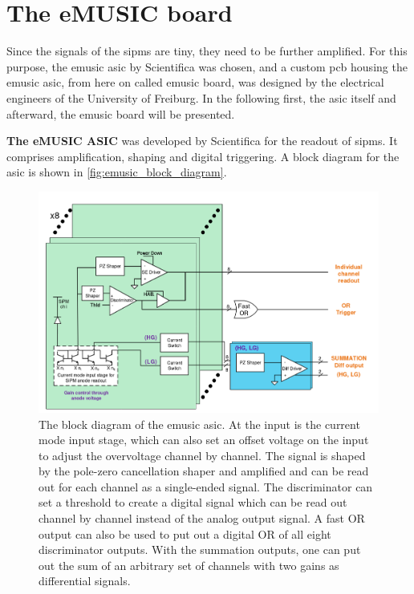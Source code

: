 \section{The eMUSIC board}
Since the signals of the \acp{sipm} are tiny, they need to be further amplified.
For this purpose, the \ac{emusic} \ac{asic} by Scientifica \cite{emusic} was chosen, and a custom \ac{pcb} housing the \ac{emusic} \ac{asic}, from here on called \ac{emusic} board, was designed by the electrical engineers of the University of Freiburg.
In the following first, the \ac{asic} itself and afterward, the \ac{emusic} board will be presented.

\textbf{The eMUSIC ASIC} was developed by Scientifica for the readout of \acp{sipm}.
It comprises amplification, shaping and digital triggering.
A block diagram for the \ac{asic} is shown in \autoref{fig:emusic_block_diagram}.
\begin{figure}
	\centering
	\includegraphics[width=1.\textwidth]{pictures/emusic_block_diagram.png}
	\caption[eMUSIC block diagram]{The block diagram of the \ac{emusic} \ac{asic}. At the input is the current mode input stage, which can also set an offset voltage on the input to adjust the overvoltage channel by channel. The signal is shaped by the pole-zero cancellation shaper and amplified and can be read out for each channel as a single-ended signal. The discriminator can set a threshold to create a digital signal which can be read out channel by channel instead of the analog output signal. A fast OR output can also be used to put out a digital OR of all eight discriminator outputs. With the summation outputs, one can put out the sum of an arbitrary set of channels with two gains as differential signals. \cite{electronics10080961}}
	\label{fig:emusic_block_diagram}
\end{figure}
